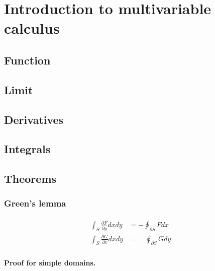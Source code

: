 \documentclass[letterpaper,10pt,english]{jupyterBook}
\begin{document}
\chapter{Introduction to multi\sphinxhyphen{}variable calculus}
\label{\detokenize{ch/multivariable/intro:introduction-to-multi-variable-calculus}}\label{\detokenize{ch/multivariable/intro:multivariable-calculus}}\label{\detokenize{ch/multivariable/intro::doc}}

\section{Function}
\label{\detokenize{ch/multivariable/intro:function}}\label{\detokenize{ch/multivariable/intro:multivariable-calculus-fun}}

\section{Limit}
\label{\detokenize{ch/multivariable/intro:limit}}\label{\detokenize{ch/multivariable/intro:multivariable-calculus-lim}}

\section{Derivatives}
\label{\detokenize{ch/multivariable/intro:derivatives}}\label{\detokenize{ch/multivariable/intro:multivariable-calculus-der}}

\section{Integrals}
\label{\detokenize{ch/multivariable/intro:integrals}}\label{\detokenize{ch/multivariable/intro:multivariable-calculus-int}}

\section{Theorems}
\label{\detokenize{ch/multivariable/intro:theorems}}

\subsection{Green’s lemma}
\label{\detokenize{ch/multivariable/intro:green-s-lemma}}\label{\detokenize{ch/multivariable/intro:multivariable-calculus-green-lemma}}\begin{equation*}
\begin{split}\begin{aligned}
  \int_{S} \frac{\partial F}{\partial y} dx dy & =     - \oint_{\partial S} F dx \\
  \int_{S} \frac{\partial G}{\partial x} dx dy & = \quad \oint_{\partial S} G dy   
\end{aligned}\end{split}
\end{equation*}\subsubsection*{Proof for simple domains.}
\end{document}
